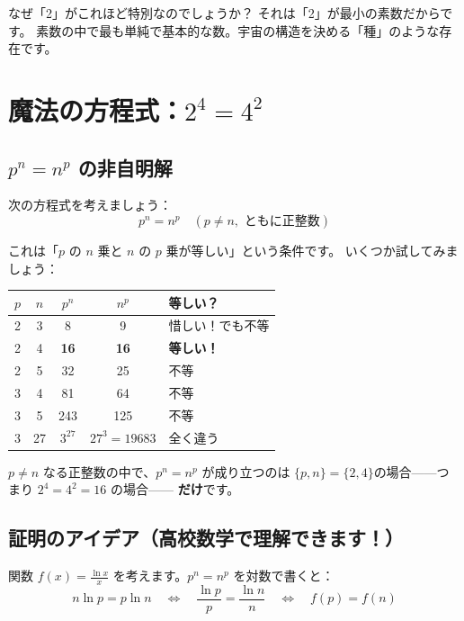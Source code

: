 \documentclass[12pt,a4paper]{article}
\begin{document}
なぜ「2」がこれほど特別なのでしょうか？ それは「2」が最小の素数だからです。
素数の中で最も単純で基本的な数。宇宙の構造を決める「種」のような存在です。

\section{魔法の方程式：$2^4 = 4^2$}

\subsection{$p^n = n^p$ の非自明解}

次の方程式を考えましょう：
\[
  p^n = n^p \quad (p \neq n, \text{ ともに正整数})
\]

これは「$p$ の $n$ 乗と $n$ の $p$ 乗が等しい」という条件です。
いくつか試してみましょう：

\begin{center}
\renewcommand{\arraystretch}{1.2}
\begin{tabular}{ccccl}
\toprule
$p$ & $n$ & $p^n$ & $n^p$ & 等しい？ \\
\midrule
2 & 3 & 8 & 9 & 惜しい！でも不等 \\
2 & 4 & \textbf{16} & \textbf{16} & \textbf{等しい！} \\
2 & 5 & 32 & 25 & 不等 \\
3 & 4 & 81 & 64 & 不等 \\
3 & 5 & 243 & 125 & 不等 \\
3 & 27 & $3^{27}$ & $27^3 = 19683$ & 全く違う \\
\bottomrule
\end{tabular}
\end{center}

\begin{keypoint}[定理]
$p \neq n$ なる正整数の中で、$p^n = n^p$ が成り立つのは
$\{p, n\} = \{2, 4\}$の場合——つまり $2^4 = 4^2 = 16$ の場合——
\textbf{だけ}です。
\end{keypoint}

\subsection{証明のアイデア（高校数学で理解できます！）}

関数 $f(x) = \frac{\ln x}{x}$ を考えます。$p^n = n^p$ を対数で書くと：
\[
  n \ln p = p \ln n \quad \Longleftrightarrow \quad \frac{\ln p}{p} = \frac{\ln n}{n}
  \quad \Longleftrightarrow \quad f(p) = f(n)
\]
\end{document}
